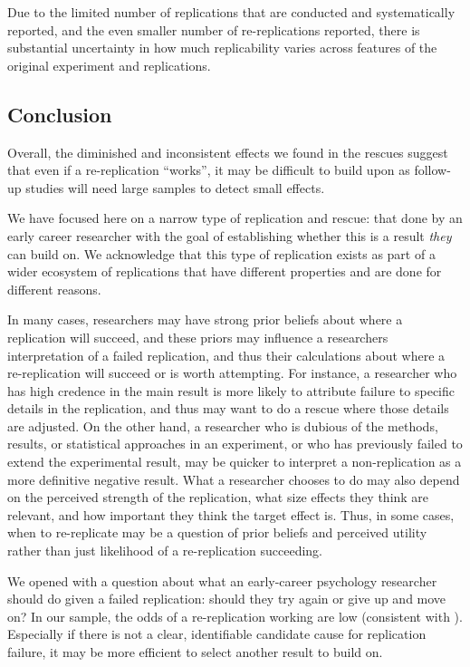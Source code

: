 \documentclass[
  english,
  a4paper,
]{article}
\begin{document}
Due to the limited number of replications that are conducted and systematically reported, and the even smaller number of re-replications reported, there is substantial uncertainty in how much replicability varies across features of the original experiment and replications.

\subsection{Conclusion}\label{conclusion}

Overall, the diminished and inconsistent effects we found in the rescues suggest that even if a re-replication ``works'', it may be difficult to build upon as follow-up studies will need large samples to detect small effects.

We have focused here on a narrow type of replication and rescue: that done by an early career researcher with the goal of establishing whether this is a result \emph{they} can build on. We acknowledge that this type of replication exists as part of a wider ecosystem of replications that have different properties and are done for different reasons.

In many cases, researchers may have strong prior beliefs about where a replication will succeed, and these priors may influence a researchers interpretation of a failed replication, and thus their calculations about where a re-replication will succeed or is worth attempting. For instance, a researcher who has high credence in the main result is more likely to attribute failure to specific details in the replication, and thus may want to do a rescue where those details are adjusted. On the other hand, a researcher who is dubious of the methods, results, or statistical approaches in an experiment, or who has previously failed to extend the experimental result, may be quicker to interpret a non-replication as a more definitive negative result. What a researcher chooses to do may also depend on the perceived strength of the replication, what size effects they think are relevant, and how important they think the target effect is. Thus, in some cases, when to re-replicate may be a question of prior beliefs and perceived utility rather than just likelihood of a re-replication succeeding.

We opened with a question about what an early-career psychology researcher should do given a failed replication: should they try again or give up and move on?
In our sample, the odds of a re-replication working are low (consistent with ).
Especially if there is not a clear, identifiable candidate cause for replication failure, it may be more efficient to select another result to build on.
\end{document}
